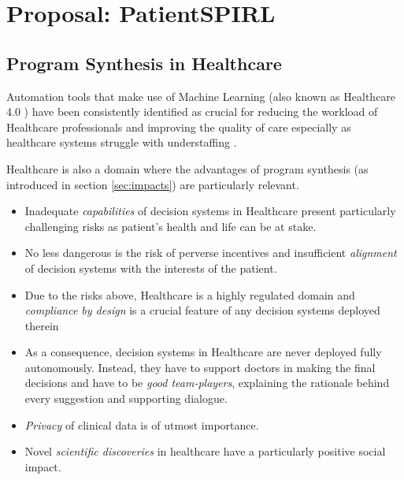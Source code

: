 \chapter{Proposal: PatientSPIRL}
\label{ch:proposal}

\section{Program Synthesis in Healthcare}
\label{sec:ps-health}

Automation tools that make use of Machine Learning (also known as Healthcare 4.0 \cite{tortorellaHealthcareTrendsChallenges2020}) have been consistently identified as crucial for reducing the workload of Healthcare professionals and improving the quality of care \cite{agrawalMachineLearningHealthcare2020, deviDesignImplementationAdvanced2022, g.kumarSurveyMachineLearning2016, ganguliMachineLearningPursuit2020, maityMachineLearningImproved2017, mitraMachineLearningHealthcare2021, pianykhImprovingHealthcareOperations2020, xhaferraRoleMachineLearning2022} especially as healthcare systems struggle with understaffing \cite{ashleyy.metcalfHospitalUnitUnderstaffing2016,SurveyShowsHidden1993,UnderstaffingSignificantIssue2012,campbellUniversalHealthCoverage2013, hudsonUnderstaffing2015, mercerMessageEditorinChief2008, r.stanleyUnderstaffedOverwhelmed2010, munnUnderstaffingWardsCompromising2017, thelancetHealthcareSystemStaffing2018}.

Healthcare is also a domain where the advantages of program synthesis (as introduced in section \ref{sec:impacts}) are particularly relevant.
\begin{itemize}
    \item Inadequate \emph{capabilities} of decision systems in Healthcare present particularly challenging risks as patient's health and life can be at stake.
    \item No less dangerous is the risk of perverse incentives and insufficient \emph{alignment} of decision systems with the interests of the patient.
    \item Due to the risks above, Healthcare is a highly regulated domain and \emph{compliance by design} is a crucial feature of any decision systems deployed therein
    \item As a consequence, decision systems in Healthcare are never deployed fully autonomously. Instead, they have to support doctors in making the final decisions and have to be \emph{good team-players}, explaining the rationale behind every suggestion and supporting dialogue.
    \item \emph{Privacy} of clinical data is of utmost importance.
    \item Novel \emph{scientific discoveries} in healthcare have a particularly positive social impact.
\end{itemize}

